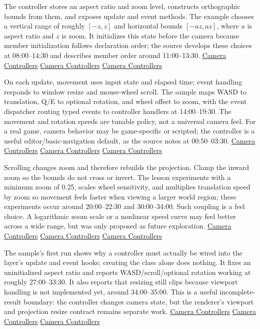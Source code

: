 The controller stores an aspect ratio and zoom level, constructs orthographic bounds from them, and exposes update and event methods. The example chooses a vertical range of roughly \([-z,z]\) and horizontal bounds \([-az,az]\), where \(a\) is aspect ratio and \(z\) is zoom. It initializes this state before the camera because member initialization follows declaration order; the source develops these choices at 08:00--14:30 and describes member order around 11:00--13:30. \href{https://www.youtube.com/watch?v=q7rwMoZQSmw&t=480s}{Camera Controllers} \href{https://www.youtube.com/watch?v=q7rwMoZQSmw&t=660s}{Camera Controllers} \href{https://www.youtube.com/watch?v=q7rwMoZQSmw&t=810s}{Camera Controllers}

On each update, movement uses input state and elapsed time; event handling responds to window resize and mouse-wheel scroll. The sample maps WASD to translation, Q/E to optional rotation, and wheel offset to zoom, with the event dispatcher routing typed events to controller handlers at 14:00--19:30. The movement and rotation speeds are tunable policy, not a universal camera feel. For a real game, camera behavior may be game-specific or scripted; the controller is a useful editor/basic-navigation default, as the source notes at 00:50--03:30. \href{https://www.youtube.com/watch?v=q7rwMoZQSmw&t=50s}{Camera Controllers} \href{https://www.youtube.com/watch?v=q7rwMoZQSmw&t=840s}{Camera Controllers} \href{https://www.youtube.com/watch?v=q7rwMoZQSmw&t=960s}{Camera Controllers}

Scrolling changes zoom and therefore rebuilds the projection. Clamp the inward zoom so the bounds do not cross or invert. The lesson experiments with a minimum zoom of 0.25, scales wheel sensitivity, and multiplies translation speed by zoom so movement feels faster when viewing a larger world region; these experiments occur around 20:00--22:30 and 30:00--34:00. Such coupling is a feel choice. A logarithmic zoom scale or a nonlinear speed curve may feel better across a wide range, but was only proposed as future exploration. \href{https://www.youtube.com/watch?v=q7rwMoZQSmw&t=1200s}{Camera Controllers} \href{https://www.youtube.com/watch?v=q7rwMoZQSmw&t=1800s}{Camera Controllers} \href{https://www.youtube.com/watch?v=q7rwMoZQSmw&t=1980s}{Camera Controllers}

The sample's first run shows why a controller must actually be wired into the layer's update and event hooks; creating the class alone does nothing. It fixes an uninitialized aspect ratio and reports WASD/scroll/optional rotation working at roughly 27:00--33:30. It also reports that resizing still clips because viewport handling is not implemented yet, around 34:00--35:00. This is a useful incomplete-result boundary: the controller changes camera state, but the renderer's viewport and projection resize contract remains separate work. \href{https://www.youtube.com/watch?v=q7rwMoZQSmw&t=1620s}{Camera Controllers} \href{https://www.youtube.com/watch?v=q7rwMoZQSmw&t=1740s}{Camera Controllers} \href{https://www.youtube.com/watch?v=q7rwMoZQSmw&t=2040s}{Camera Controllers}

